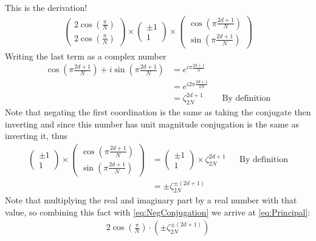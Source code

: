 \documentclass{article}
\begin{document}
This is the derivation!
\begin{align}
	\begin{pmatrix}
		2\cos\left(\frac{\pi}{N}\right) \\
		2\cos\left(\frac{\pi}{N}\right)
	\end{pmatrix}
	\times
	\begin{pmatrix}
		\pm 1 \\
		1
	\end{pmatrix}
	\times
	\begin{pmatrix}
		\cos\left(\pi\textstyle\frac{2d+1}{N}\right) \\
		\sin\left(\pi\textstyle\frac{2d+1}{N}\right)
	\end{pmatrix}
	\label{eq:Principal}
\end{align}
Writing the last term as a complex number 
\begin{align}
	\cos\left(\pi\frac{2d+1}{N}\right) + 
	i\sin\left(\pi\frac{2d+1}{N}\right)
	&= e^{i\pi\frac{2d+1}{N}}  \nonumber\\
	&=e^{i2\pi\frac{2d+1}{2N}} \nonumber\\
	&=\zeta_{2N}^{2d + 1} && \text{By definition}
\end{align}
Note that negating the first coordination is the same as taking the conjugate then inverting and since this number has unit magnitude conjugation is the same as inverting it, thus
\begin{align}
	\begin{pmatrix}
		\pm 1 \\
		1
	\end{pmatrix}
	\times
	\begin{pmatrix}
		\cos\left(\pi\textstyle\frac{2d+1}{N}\right) \\
		\sin\left(\pi\textstyle\frac{2d+1}{N}\right)
	\end{pmatrix}
	&= 
	\begin{pmatrix}
		\pm 1 \\
		1
	\end{pmatrix}
	\times
	\zeta_{2N}^{2d + 1} && \text{By definition}\nonumber \\
	&= \pm\zeta_{2N}^{\pm (2d + 1)}
	\label{eq:NegConjugation}
\end{align}
Note that multiplying the real and imaginary part by a real number with that value, so combining this fact with \eqref{eq:NegConjugation} we arrive at \eqref{eq:Principal}:
\begin{align}
	2\cos\left(\frac{\pi}{N}\right)\cdot\left(\pm\zeta_{2N}^{\pm (2d + 1)}\right)
	\label{eq:MultiplicationTerm}
\end{align}
\end{document}
